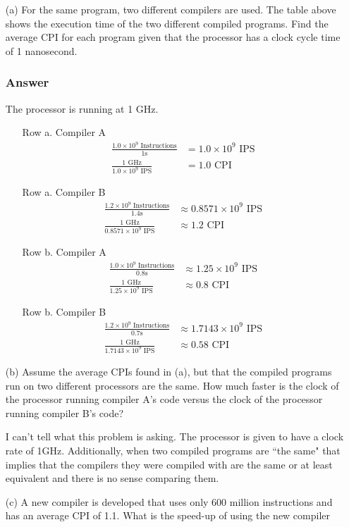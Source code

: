 \documentclass[12pt]{article}
\begin{document}
\begin{itemize}
\item[(a)] For the same program, two different compilers are used. The table above shows the execution time of the two different compiled programs. Find the average CPI for each program given that the processor has a clock cycle time of 1 nanosecond.
\subsubsection*{Answer}
The processor is running at 1 GHz.
\begin{itemize}
\item[Row a. Compiler A]
\begin{align*}
\frac{1.0 \times 10^9 \text{ Instructions}}{1\text{s}} &= 1.0 \times 10^9\text{ IPS} \\
\frac{1\text{ GHz}}{1.0 \times 10^9\text{ IPS}} &= 1.0\text{ CPI}
\end{align*}
\item[Row a. Compiler B]
\begin{align*}
\frac{1.2 \times 10^9 \text{ Instructions}}{1.4\text{s}} &\approx 0.8571 \times 10^9\text{ IPS} \\
\frac{1\text{ GHz}}{0.8571 \times 10^9\text{ IPS}} &\approx 1.2\text{ CPI}
\end{align*}
\item[Row b. Compiler A]
\begin{align*}
\frac{1.0 \times 10^9 \text{ Instructions}}{0.8\text{s}} &\approx 1.25 \times 10^9\text{ IPS} \\
\frac{1\text{ GHz}}{1.25 \times 10^9\text{ IPS}} &\approx 0.8\text{ CPI}
\end{align*}
\item[Row b. Compiler B]
\begin{align*}
\frac{1.2 \times 10^9 \text{ Instructions}}{0.7\text{s}} &\approx 1.7143 \times 10^9\text{ IPS} \\
\frac{1\text{ GHz}}{1.7143 \times 10^9\text{ IPS}} &\approx 0.58\text{ CPI}
\end{align*}
\end{itemize}
\item[(b)] Assume the average CPIs found in (a), but that the compiled programs run on two different processors are the same. How much faster is the clock of the processor running compiler A's code versus the clock of the processor running compiler B's code?

I can't tell what this problem is asking. The processor is given to have a clock rate of 1GHz. Additionally, when two compiled programs are ``the same" that implies that the compilers they were compiled with are the same or at least equivalent and there is no sense comparing them.
\item[(c)] A new compiler is developed that uses only 600 million instructions and has an average CPI of 1.1. What is the speed-up of using the new compiler 

\end{itemize}
\end{document}
